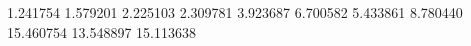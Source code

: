 1.241754
1.579201
2.225103
2.309781
3.923687
6.700582
5.433861
8.780440
15.460754
13.548897
15.113638
